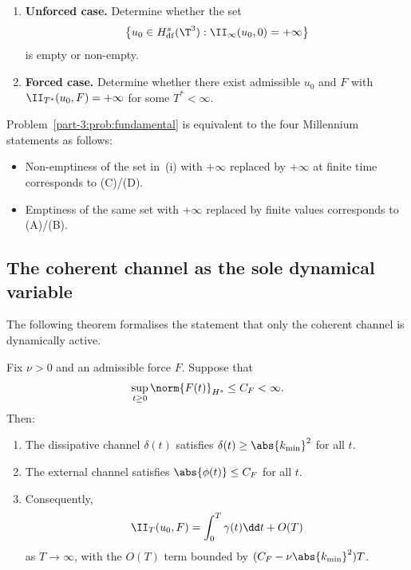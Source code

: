\begin{problem}\label{part-3:prob:fundamental}
\begin{enumerate}[label=(\roman*),leftmargin=*]
\item \textbf{Unforced case.} Determine whether the set
      \begin{equation}\label{part-3:eq:unforced-set}
      \bigl\{u_0\in H^s_{\mathrm{df}}(\T^3) : 
      \II_\infty(u_0,0) = +\infty\bigr\}
      \end{equation}
      is empty or non-empty.
\item \textbf{Forced case.} Determine whether there exist admissible 
      $u_0$ and $F$ with 
      $\II_{T^\ast}(u_0,F)=+\infty$ for some $T^\ast<\infty$.
\end{enumerate}
\end{problem}

\begin{remark}\label{part-3:rem:statement-corr}
Problem~\ref{part-3:prob:fundamental} is equivalent to the four Millennium 
statements as follows:
\begin{itemize}[leftmargin=*]
\item Non-emptiness of the set in~(i) with $+\infty$ replaced by 
      $+\infty$ at finite time corresponds to (C)/(D).
\item Emptiness of the same set with $+\infty$ replaced by finite 
      values corresponds to (A)/(B).
\end{itemize}
\end{remark}

\subsection{The coherent channel as the sole dynamical variable}
\label{part-3:ssec:coherence-only}

The following theorem formalises the statement that only the coherent 
channel is dynamically active.

\begin{theorem}\label{part-3:thm:coherence-only}
Fix $\nu>0$ and an admissible force $F$. Suppose that
\begin{equation}\label{part-3:eq:no-blowup-assumption}
\sup_{t\geq 0}\norm{F(t)}_{H^s}\leq C_F < \infty.
\end{equation}
Then:
\begin{enumerate}[label=(\roman*),leftmargin=*]
\item The dissipative channel $\delta(t)$ satisfies 
      $\delta(t)\geq\abs{k_{\min}}^2$ for all $t$.
\item The external channel satisfies $\abs{\phi(t)}\leq C_F$ for all 
      $t$.
\item Consequently, 
      \begin{equation}\label{part-3:eq:reduction-chi}
      \II_T(u_0,F) = \int_0^T\gamma(t)\dd t + O(T)
      \end{equation}
      as $T\to\infty$, with the $O(T)$ term bounded by 
      $(C_F - \nu\abs{k_{\min}}^2)T$.
\end{enumerate}
\end{theorem}

